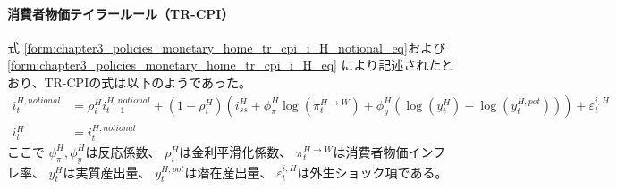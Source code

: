 \paragraph{消費者物価テイラールール（TR-CPI）}
\label{sec:chapter5_beta_shock_policies_tr_cpi}
式
\eqref{form:chapter3_policies_monetary_home_tr_cpi_i_H_notional_eq}および
\eqref{form:chapter3_policies_monetary_home_tr_cpi_i_H_eq}
により記述されたとおり、TR-CPIの式は以下のようであった。
\begin{align}
\label{form:chapter5_beta_shock_policies_tr_cpi_i_H_notional_eq}
    i_t^{H,notional}&=\rho_i^Hi_{t-1}^{H,notional}+(1-\rho_i^H)\left(i_{ss}^H+\phi_{\pi}^H\log(\pi_t^{H\to W})+\phi_y^H(\log(y_t^H)-\log(y_t^{H,pot}))\right)+\varepsilon_t^{i,H} \\
\label{form:chapter5_beta_shock_policies_tr_cpi_i_H_eq}
    i_t^H&=i_t^{H,notional}
\end{align}
ここで
\(\phi_{\pi}^H, \phi_y^H\)は反応係数、
\(\rho_i^H\)は金利平滑化係数、
\(\pi_t^{H\to W}\)は消費者物価インフレ率、
\(y_t^H\)は実質産出量、
\(y_t^{H,pot}\)は潜在産出量、
\(\varepsilon_t^{i,H}\)は外生ショック項である。
